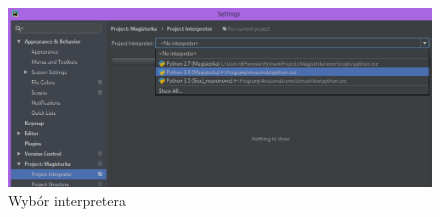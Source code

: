 \begin{figure}[h]
\centering
\includegraphics[width=14cm]{Zdjecia/5/pycharm4}
\caption{Wybór interpretera}
\label{fig:pycharm2}
\end{figure}










